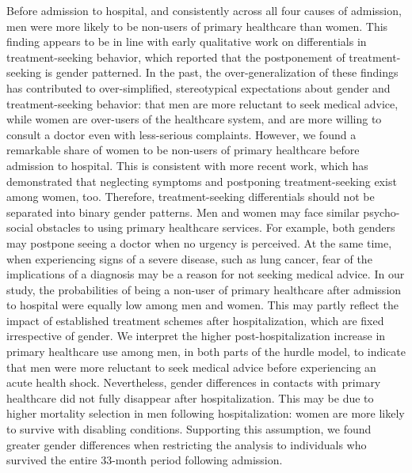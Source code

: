 Before admission to hospital, and consistently across all four causes 
of admission, men were more likely to be non-users of primary healthcare 
than women. This finding  appears to be in line with early qualitative 
work on differentials in treatment-seeking behavior, which reported 
that the postponement of treatment-seeking is gender patterned.\citep{robertson2006not,
o2005s,smith2005patients,courtenay2000constructions} In the past, the 
over-generalization of these findings has contributed to over-simplified, 
stereotypical expectations about gender and treatment-seeking behavior: 
that men are more reluctant to seek medical advice, while women are 
over-users of the healthcare system, and are more willing to consult 
a doctor even with less-serious complaints.\citep{maclean2017does,
annandale2007gender} However, we found a remarkable share of 
women to be non-users of primary healthcare before admission to 
hospital. This is consistent with more recent work, which has 
demonstrated that neglecting symptoms and postponing treatment-seeking 
exist among women, too.\citep{maclean2017does} Therefore, 
treatment-seeking differentials should not be separated into 
binary gender patterns. Men and women may face similar psycho-social 
obstacles to using primary healthcare services.\citep{galdas2010help} 
For example, both genders may postpone seeing a doctor when no urgency 
is perceived.\citep{hunt2011women} At the same time, when experiencing 
signs of a severe disease, such as lung cancer, fear of the implications 
of a diagnosis may be a reason for not seeking medical advice.\citep{hamann2014stigma,
chambers2012systematic,scambler2009health} In our study, the probabilities 
of being a non-user of primary healthcare after admission to hospital were 
equally low among men and women. This may partly reflect the impact of 
established treatment schemes after hospitalization, which are fixed 
irrespective of gender. We interpret the higher post-hospitalization 
increase in primary healthcare use among men, in both parts of the 
hurdle model, to indicate that  men were more reluctant to seek medical 
advice before experiencing an acute health shock. Nevertheless, gender 
differences in contacts with primary healthcare did not fully disappear 
after hospitalization. This may be due to higher mortality selection in 
men following hospitalization: women are more likely to survive with 
disabling conditions.\citep{hohn2018sex}  Supporting this assumption, 
we found greater gender differences when restricting the analysis to 
individuals who survived the entire 33-month period following admission.\\

